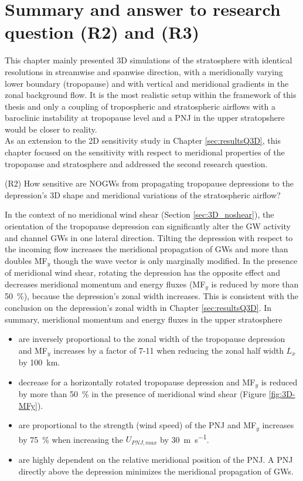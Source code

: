 %
\section{Summary and answer to research question (R2) and (R3)}
\label{sec:3D_summary}
This chapter mainly presented 3D simulations of the stratosphere with identical resolutions in streamwise and spanwise direction, with a meridionally varying lower boundary (tropopause) and with vertical and meridional gradients in the zonal background flow. It is the most realistic setup within the framework of this thesis and only a coupling of tropospheric and stratospheric airflows with a baroclinic instability at tropopause level and a PNJ in the upper stratopshere would be closer to reality. \\
As an extension to the 2D sensitivity study in Chapter \ref{sec:resultsQ3D}, this chapter focused on the sensitivity with respect to meridional properties of the tropopause and stratosphere and addressed the second research question.
\begin{tcolorbox}[]
    (R2) How sensitive are NOGWs from propagating tropopause depressions to the depression's 3D shape and meridional variations of the stratospheric airflow?
\end{tcolorbox}
In the context of no meridional wind shear (Section \ref{sec:3D_noshear}), the orientation of the tropopause depression can significantly alter the GW activity and channel GWs in one lateral direction. Tilting the depression with respect to the incoming flow increases the meridional propagation of GWs and more than doubles MF$_y$ though the wave vector is only marginally modified. In the presence of meridional wind shear, rotating the depression has the opposite effect and decreases meridional momentum and energy fluxes (MF$_y$ is reduced by more than \SI{50}{\percent}), because the depression's zonal width increases. This is consistent with the conclusion on the depression's zonal width in Chapter \ref{sec:resultsQ3D}. In summary, meridional momentum and energy fluxes in the upper stratosphere
\begin{itemize}
    \item are inversely proportional to the zonal width of the tropopause depression and MF$_y$ increases by a factor of 7-11 when reducing the zonal half width $L_x$ by \SI{100}{\kilo\meter}.
    \item decrease for a horizontally rotated tropopause depression and MF$_y$ is reduced by more than \SI{50}{\percent} in the presence of meridional wind shear (Figure \ref{fig:3D-MFy}).
    \item are proportional to the strength (wind speed) of the PNJ and MF$_y$ increases by \SI{75}{\percent} when increasing the $U_{PNJ,max}$ by \SI{30}{\meter\per\second}.
    \item are highly dependent on the relative meridional position of the PNJ. A PNJ directly above the depression minimizes the meridional propagation of GWs.
\end{itemize}
